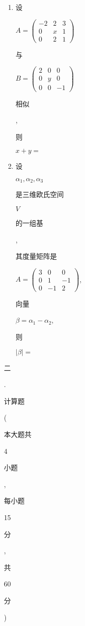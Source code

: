 \documentclass[10pt]{article}
\begin{document}
\begin{enumerate}
  \item \begin{CJK}{UTF8}{mj}设\end{CJK} $A=\left(\begin{array}{ccc}-2 & 2 & 3 \\ 0 & x & 1 \\ 0 & 2 & 1\end{array}\right)$ \begin{CJK}{UTF8}{mj}与\end{CJK} $B=\left(\begin{array}{ccc}2 & 0 & 0 \\ 0 & y & 0 \\ 0 & 0 & -1\end{array}\right)$ \begin{CJK}{UTF8}{mj}相似\end{CJK}, \begin{CJK}{UTF8}{mj}则\end{CJK} $x+y=$

  \item \begin{CJK}{UTF8}{mj}设\end{CJK} $\alpha_{1}, \alpha_{2}, \alpha_{3}$ \begin{CJK}{UTF8}{mj}是三维欧氏空间\end{CJK} $V$ \begin{CJK}{UTF8}{mj}的一组基\end{CJK}, \begin{CJK}{UTF8}{mj}其度量矩阵是\end{CJK} $A=\left(\begin{array}{ccc}3 & 0 & 0 \\ 0 & 1 & -1 \\ 0 & -1 & 2\end{array}\right)$, \begin{CJK}{UTF8}{mj}向量\end{CJK} $\beta=\alpha_{1}-\alpha_{2}$, \begin{CJK}{UTF8}{mj}则\end{CJK} $|\beta|=$

\end{enumerate}
\begin{CJK}{UTF8}{mj}二\end{CJK}. \begin{CJK}{UTF8}{mj}计算题\end{CJK} (\begin{CJK}{UTF8}{mj}本大题共\end{CJK} 4 \begin{CJK}{UTF8}{mj}小题\end{CJK}, \begin{CJK}{UTF8}{mj}每小题\end{CJK} 15 \begin{CJK}{UTF8}{mj}分\end{CJK}, \begin{CJK}{UTF8}{mj}共\end{CJK} 60 \begin{CJK}{UTF8}{mj}分\end{CJK})
\end{document}
